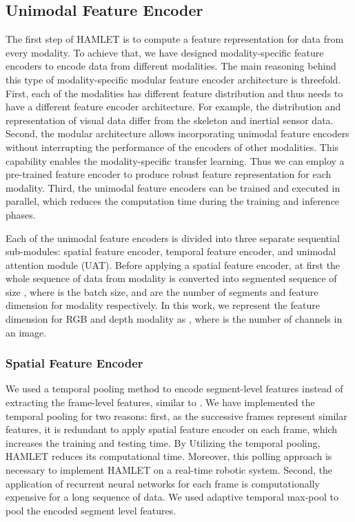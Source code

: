 \documentclass[runningheads]{llncs}
\newcommand{\pa}{HAMLET}
\begin{document}
\subsection{Unimodal Feature Encoder}
The first step of {\pa} is to compute a feature representation for data from every modality. To achieve that, we have designed modality-specific feature encoders to encode data from different modalities. The main reasoning behind this type of modality-specific modular feature encoder architecture is threefold. First, each of the modalities has different feature distribution and thus needs to have a different feature encoder architecture. For example, the distribution and representation of visual data differ from the skeleton and inertial sensor data. Second, the modular architecture allows incorporating unimodal feature encoders without interrupting the performance of the encoders of other modalities. This capability enables the modality-specific transfer learning. Thus we can employ a pre-trained feature encoder to produce robust feature representation for each modality. Third, the unimodal feature encoders can be trained and executed in parallel, which reduces the computation time during the training and inference phases.





Each of the unimodal feature encoders is divided into three separate sequential sub-modules: spatial feature encoder, temporal feature encoder, and unimodal attention module (UAT). Before applying a spatial feature encoder, at first the whole sequence of data  from modality  is converted into segmented sequence  of size , where  is the batch size,  and  are the number of segments and feature dimension for modality  respectively. In this work, we represent the feature dimension  for RGB and depth modality as , where  is the number of channels in an image. 

\subsubsection{Spatial Feature Encoder}
We used a temporal pooling method to encode segment-level features instead of extracting the frame-level features, similar to \cite{keyless}. We have implemented the temporal pooling for two reasons: first, as the successive frames represent similar features, it is redundant to apply spatial feature encoder on each frame, which increases the training and testing time. By Utilizing the temporal pooling, {\pa} reduces its computational time. Moreover, this polling approach is necessary to implement {\pa} on a real-time robotic system. Second, the application of recurrent neural networks for each frame is computationally expensive for a long sequence of data. We used adaptive temporal max-pool to pool the encoded segment level features. 
\end{document}
